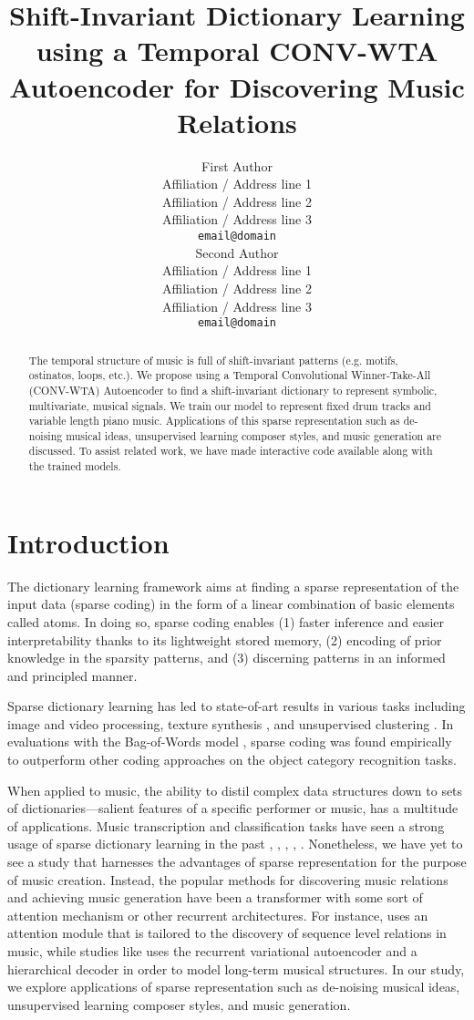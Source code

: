 \documentclass[11pt,a4paper]{article}
\title{Shift-Invariant Dictionary Learning using a Temporal CONV-WTA Autoencoder for Discovering Music Relations }
\author{First Author \\
  Affiliation / Address line 1 \\
  Affiliation / Address line 2 \\
  Affiliation / Address line 3 \\
  \texttt{email@domain} \\\And
  Second Author \\
  Affiliation / Address line 1 \\
  Affiliation / Address line 2 \\
  Affiliation / Address line 3 \\
  \texttt{email@domain} \\}
\date{}
\begin{document}
\maketitle
\begin{abstract}
The temporal structure  of music is full of shift-invariant patterns (e.g. motifs, ostinatos, loops, etc.). We propose using a Temporal Convolutional Winner-Take-All (CONV-WTA) Autoencoder to find a shift-invariant dictionary to represent symbolic, multivariate, musical signals. We train our model to represent fixed drum tracks and variable length piano music. Applications of this sparse representation such as de-noising musical ideas, unsupervised learning composer styles, and music generation are discussed. To assist related work, we have made interactive code available along with the trained models. 

\end{abstract}

\section{Introduction}

The dictionary learning framework aims at finding a sparse representation of the input data (sparse coding) in the form of a linear combination of basic elements called atoms. In doing so, sparse coding enables (1) faster inference and easier interpretability thanks to its lightweight stored memory, (2) encoding of prior knowledge in the sparsity patterns, and (3) discerning patterns in an informed and principled manner.  

 Sparse dictionary learning has led to state-of-art results in various tasks including image and video processing, texture synthesis \cite{Peyre2009}, and unsupervised clustering \cite{Ramrez2010ClassificationAC}. In evaluations with the Bag-of-Words model \cite{7439823}, sparse coding was found empirically to outperform other coding approaches on the object category recognition tasks.  

When applied to music, the ability to distil complex data structures down to sets of dictionaries—salient features of a specific performer or music, has a multitude of applications. Music transcription and classification tasks have seen a strong usage of sparse dictionary learning in the past \cite{Grosse2007} \cite{Costantini2013}, \cite{Blumensath2006}, \cite{SrinivasM2014}, \cite{Srinivas2014}, \cite{Cogliati2016}. Nonetheless, we have yet to see a study that harnesses the advantages of sparse representation for the purpose of music creation. Instead, the popular methods for discovering music relations and achieving music generation have been a transformer with some sort of attention mechanism or other recurrent architectures. For instance, \cite{JiangJunyan2020} uses an attention module that is tailored to the discovery of sequence level relations in music, while studies like \cite{Roberts2018} uses the recurrent variational autoencoder and a hierarchical decoder in order to model long-term musical structures. In our study, we explore applications of sparse representation such as de-noising musical ideas, unsupervised learning composer styles, and music generation.
\end{document}
